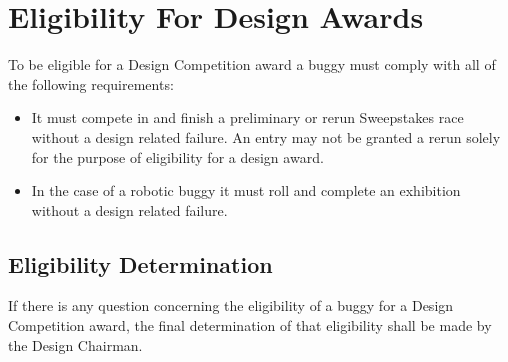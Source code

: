 \section{Eligibility For Design Awards}

	To be eligible for a Design Competition award a buggy must comply with all of the following requirements:
	\newline

	\begin{itemize}
		\item It must compete in and finish a preliminary or rerun Sweepstakes race without a design related failure. An entry may not be granted a rerun solely for the purpose of eligibility for a design award.
        \item In the case of a robotic buggy it must roll and complete an exhibition without a design related failure.
	\end{itemize}

\subsection{Eligibility Determination}

	If there is any question concerning the eligibility of a buggy for a Design Competition award, the final determination of that eligibility shall be made by the Design Chairman.


